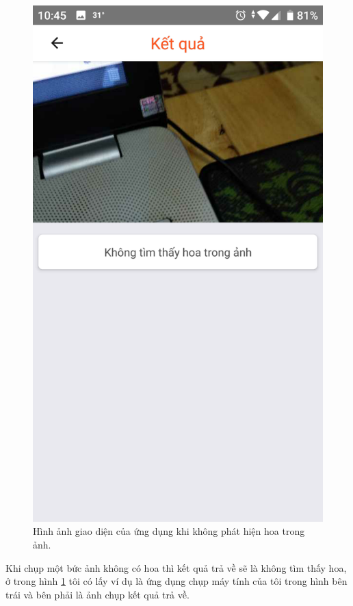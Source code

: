 \documentclass[12pt]{report}
\begin{document}
\begin{figure}[h]
			\includegraphics[scale=0.2]{app_no_flower2}
			\caption{Hình ảnh giao diện của ứng dụng khi không phát hiện hoa trong ảnh.}
			\label{fig:app_no_flower}
		\end{figure}
		Khi chụp một bức ảnh không có hoa thì kết quả trả về sẽ là không tìm thấy hoa, ở trong hình \ref{fig:app_no_flower} tôi có lấy ví dụ là ứng dụng chụp máy tính của tôi trong hình bên trái và bên phải là ảnh chụp kết quả trả về.\newpage
				
\end{document}
